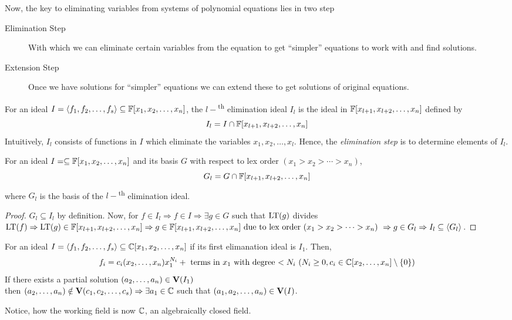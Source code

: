\documentclass[a4paper,11pt]{article}
\begin{document}
Now, the key to eliminating variables from systems of polynomial equations lies in two step
\begin{description}
    \item[Elimination Step] With which we can eliminate certain variables from the equation to get ``simpler'' equations to work with and find solutions.
    \item[Extension Step] Once we have solutions for ``simpler'' equations we can extend these to get solutions of original equations.
\end{description}
\begin{defn}
    For an ideal $I=\langle f_1,f_2,\ldots,f_s\rangle\subseteq\mathbb{F}[x_1, x_2, \ldots, x_n]$, the $l-$\textsuperscript{th} elimination ideal $I_l$ is the ideal in $\mathbb{F}[x_{l+1}, x_{l+2}, \ldots, x_n]$ defined by
    \begin{equation}
        I_l = I \cap \mathbb{F}[x_{l+1}, x_{l+2}, \ldots, x_n]
    \end{equation} 
    Intuitively,   $I_l$  consists of functions in $I$ which eliminate the variables $x_1, x_2, \ldots, x_l$. Hence, the \emph{elimination step} is to determine elements of $I_l$.
\end{defn}
\begin{theorem}
    For an ideal $I=\subseteq\mathbb{F}[x_1, x_2, \ldots, x_n]$ and its \Grob basis $G$ with respect to lex order $(x_1>x_2>\cdots>x_n)$,
    \begin{equation}
        G_l = G \cap \mathbb{F}[x_{l+1}, x_{l+2}, \ldots, x_n]
    \end{equation}
    where $G_l$ is the \Grob basis of the $l-$\textsuperscript{th} elimination ideal.
\end{theorem}
\begin{proof}
    $G_l\subseteq I_l$ by definition. Now, for $f\in I_l\Rightarrow f\in I\Rightarrow \exists g\in G$ such that $\operatorname{LT}(g)$ divides $\operatorname{LT}(f)\Rightarrow \operatorname{LT}(g)\in\mathbb{F}[x_{l+1}, x_{l+2}, \ldots, x_n]\Rightarrow g \in \mathbb{F}[x_{l+1}, x_{l+2}, \ldots, x_n] \text{ due to lex order $(x_1>x_2>\cdots>x_n)$ }\Rightarrow g \in G_l\Rightarrow I_l \subseteq \langle G_l\rangle$.
\end{proof}
\begin{theorem}
    For an ideal $I=\langle f_1,f_2,\ldots,f_s\rangle\subseteq\mathbb{C}[x_1, x_2, \ldots, x_n]$ if its first elimanation ideal is $I_1$. Then,
    \begin{equation}
        f_i = c_i(x_2,\ldots,x_n)x_1^{N_i} + \text{ terms in $x_1$ with degree $< N_i$}\ (N_i\geq0, c_i\in\mathbb{C}[x_2, \ldots, x_n]\setminus\{0\})
    \end{equation}
    If there exists a partial solution $(a_2, \ldots, a_n)\in \textbf{V}(I_1)$ \\
    then $(a_2, \ldots, a_n)\notin \textbf{V}(c_1, c_2, \ldots, c_s)\Rightarrow \exists a_1\in \mathbb{C}$ such that $(a_1, a_2, \ldots, a_n)\in \textbf{V}(I)$.
\end{theorem} 
Notice, how the working field is now $\mathbb{C}$, an algebraically closed field.
\end{document}
